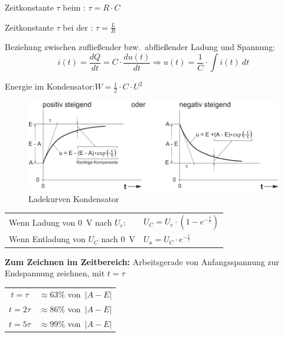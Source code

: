 \documentclass[a5paper, 12pt, twoside]{scrartcl}
\begin{document}
Zeitkonstante \(\tau\) beim : \dotfill \(\tau = R \cdot C\)

Zeitkonstante \(\tau\) bei der : \dotfill \(\tau = \frac{L}{R}\)

Beziehung zwischen zufließender bzw.\ abfließender Ladung und Spannung:
\[i(t) = \frac{dQ}{dt} = C \cdot \frac{du(t)}{dt} \Rightarrow u(t) = \frac{1}{C} \cdot \int i(t)\ dt\]

Energie im Kondensator:\dotfill\(W = \frac{1}{2} \cdot C \cdot U^2\)

\begin{figure}[H]
  \centering
  \includegraphics[width=.7\textwidth]{LadekurveKondensator}
  \caption{Ladekurven Kondensator }
\end{figure}

\begin{center}
  \begin{tabular}{ll}
    \toprule
    Wenn Ladung von \SI{0}{\volt} nach \(U_e\): & \(U_C = U_e \cdot (1 - e^{-\frac{t}{\tau}})\)\\
    Wenn Entladung von \(U_C\) nach \SI{0}{\volt} & \(U_a = U_C \cdot e^{-\frac{t}{\tau}}\)\\
    \bottomrule
  \end{tabular}
\end{center}

\textbf{Zum Zeichnen im Zeitbereich:} Arbeitsgerade von Anfangsspannung zur Endspannung zeichnen, mit \(t = \tau\)


\begin{table}[H]
  \centering
  \begin{tabular}{cc}
    \toprule
    \(t=\tau\) & \(\approx 63\%\) von\ \(|A-E|\)\\
    \(t=2\tau\) & \(\approx 86\%\) von\ \(|A-E|\)\\
    \(t=5\tau\) & \(\approx 99\%\) von\ \(|A-E|\)\\
    \bottomrule
  \end{tabular}
\end{table}
\end{document}
